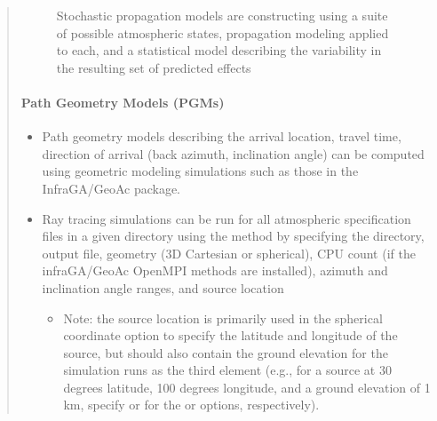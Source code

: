 \documentclass[letterpaper,10pt,english]{sphinxmanual}
\let\sphinxpxdimen\pdfpxdimen\else\newdimen\sphinxpxdimen
\begin{document}
\begin{itemize}
\begin{quote}
\begin{figure}[htbp]
\noindent\sphinxincludegraphics[width=500\sphinxpxdimen]{{stochprop_fig1}.jpg}
\caption{Stochastic propagation models are constructing using a suite of possible atmospheric states, propagation modeling applied to each, and a statistical model describing the variability in the resulting set of predicted effects}\label{\detokenize{propagation:id2}}\end{figure}


\paragraph{Path Geometry Models (PGMs)}
\label{\detokenize{propagation:path-geometry-models-pgms}}\begin{itemize}
\item {} 
\sphinxAtStartPar
Path geometry models describing the arrival location, travel time, direction of arrival (back azimuth, inclination angle) can be computed using geometric modeling simulations such as those in the InfraGA/GeoAc package.

\item {} 
\sphinxAtStartPar
Ray tracing simulations can be run for all atmospheric specification files in a given directory using the  method by specifying the directory, output file, geometry (3D Cartesian or spherical), CPU count (if the infraGA/GeoAc OpenMPI methods are installed), azimuth and inclination angle ranges, and source location
\begin{itemize}
\item {} 
\sphinxAtStartPar
Note: the source location is primarily used in the spherical coordinate option to specify the latitude and longitude of the source, but should also contain the ground elevation for the simulation runs as the third element (e.g., for a source at 30 degrees latitude, 100 degrees longitude, and a ground elevation of 1 km, specify  or  for the  or  options, respectively).

\end{itemize}

\end{itemize}

\begin{sphinxVerbatim}[commandchars=\\\{\}]
   


\end{sphinxVerbatim}
\end{quote}
\end{itemize}
\end{document}
